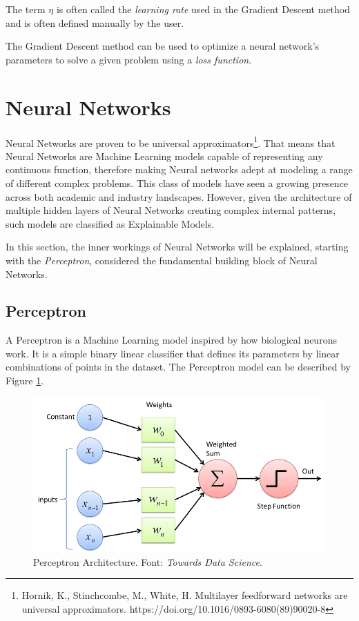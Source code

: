 The term \(\eta\) is often called the \emph{learning rate} used in the Gradient Descent method and is often defined manually by the user.

The Gradient Descent method can be used to optimize a neural network's parameters to solve a given problem using a \emph{loss function}. 

\section{Neural Networks}

Neural Networks are proven to be universal approximators\footnote{Hornik, K., Stinchcombe, M., White, H. Multilayer feedforward networks are universal approximators. https://doi.org/10.1016/0893-6080(89)90020-8}. That means that Neural Networks are Machine Learning models capable of representing any continuous function,
therefore making Neural networks adept at modeling a range of different complex problems.
This class of models have seen a growing presence across both academic and industry landscapes. However, given the architecture of multiple hidden layers of Neural Networks creating complex internal patterns, such models are classified as Explainable Models. 

In this section, the inner workings of Neural Networks will be explained, starting with the \emph{Perceptron}, considered the fundamental building block of Neural Networks.

\subsection{Perceptron}

A Perceptron is a Machine Learning model inspired by how biological neurons work. 
It is a simple binary linear classifier that defines its parameters by linear combinations of points in the dataset.
The Perceptron model can be described by Figure \ref{fig:perceptron}. 

\begin{figure}
    \centering
    \includegraphics[scale=0.4]{figuras/perceptron.png}
    \caption{Perceptron Architecture. Font: \emph{Towards Data Science\footnotemark}. \label{fig:perceptron}}
\end{figure}

